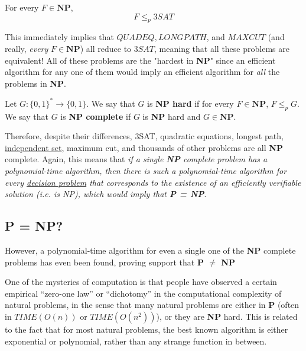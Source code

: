   \begin{theorem}
    \label{thm:cook-levin-theorem}
  For every $F \in \mathbf{NP}$, 
  \begin{equation}
    F \leq_p 3SAT
  \end{equation}
  \end{theorem}
  This immediately implies that $QUADEQ, LONGPATH$, and $MAXCUT$ (and really, \textit{every} $F \in \mathbf{NP}$) all reduce to $3SAT$, meaning that all these problems are equivalent! All of these problems are the "hardest in \textbf{NP}" since an efficient algorithm for any one of them would imply an efficient algorithm for \textit{all} the problems in \textbf{NP}. 

  \begin{definition}[NP-Hard]
    \label{def:np-hard}
  Let $G: \{0,1\}^* \to \{0,1\}$. We say that $G$ is \textbf{NP hard} if for every $F \in \mathbf{NP}$, $F \leq_p G$. We say that $G$ is \textbf{NP complete} if $G$ is \textbf{NP} hard and $G \in \mathbf{NP}$. 
  \end{definition}

  Therefore, despite their differences, 3SAT, quadratic equations, longest path, \hyperref[def:independent-set]{independent set}, maximum cut, and thousands of other problems are all \textbf{NP} complete. Again, this means that \textit{if a single \textbf{NP} complete problem has a polynomial-time algorithm, then there is such a polynomial-time algorithm for every \hyperref[def:decision-problem]{decision problem} that corresponds to the existence of an efficiently verifiable solution (i.e. is NP), which would imply that \textbf{P = NP}}.

\subsection{P = NP?}

  However, a polynomial-time algorithm for even a single one of the \textbf{NP} complete problems has even been found, proving support that \textbf{P $\neq$ NP}

  One of the mysteries of computation is that people have observed a certain empirical “zero-one law” or “dichotomy” in the computational complexity of natural problems, in the sense that many natural problems are either in \textbf{P} (often in $TIME(O(n))$ or $TIME(O(n^2))$), or they are \textbf{NP} hard. This is related to the fact that for most natural problems, the best known algorithm is either exponential or polynomial, rather than any strange function in between. 

